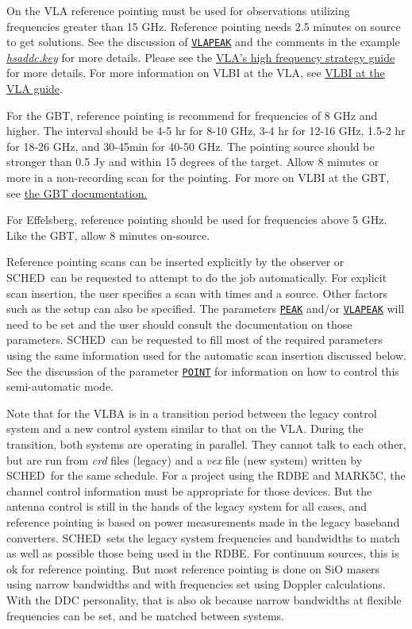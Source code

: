 \documentclass{report}
\newcommand{\schedb}{{\sc SCHED~}}
\begin{document}
On the VLA reference pointing must be used for observations utilizing
frequencies greater than 15 GHz.  Reference pointing needs 2.5 minutes
on source to get solutions.
See the discussion of 
{\hyperref[MP:VLAPEAK]{{\tt VLAPEAK}}} and the comments in the example
{\href{examples/hsaddc.key}{{\sl hsaddc.key}}} for more
details.  Please see  the 
{\href{https://science.nrao.edu/facilities/vla/docs/manuals/obsguide/modes/hifreq/strategy}{VLA's high frequency strategy guide}}
for more details.  For more information
on VLBI at the VLA, see 
{\href{https://science.nrao.edu/facilities/vla/docs/manuals/obsguide/modes/vlbi}{VLBI at the VLA guide}}.

For the GBT, reference pointing is recommend for frequencies of 8 GHz
and higher.  The interval should be 4-5 hr for 8-10 GHz, 3-4 hr for
12-16 GHz, 1.5-2 hr for 18-26 GHz, and 30-45min for 40-50 GHz.  The
pointing source should be stronger than 0.5 Jy and within 15 degrees
of the target.  Allow 8 minutes or more in a non-recording scan for
the pointing.  For more on VLBI at the GBT, see 
{\href{http://www.gb.nrao.edu/~fghigo/gbtdoc/vlbinfo.html}{the GBT documentation.}}

For Effelsberg, reference pointing should be used for frequencies 
above 5 GHz.  Like the GBT, allow 8 minutes on-source.

Reference pointing scans can be inserted explicitly by the observer or
\schedb can be requested to attempt to do the job automatically.  For
explicit scan insertion, the user specifies a scan with times and a
source.  Other factors such as the setup can also be specified.  The
parameters 
{\hyperref[MP:PEAK]{{\tt PEAK}}} and/or 
{\hyperref[MP:VLAPEAK]{{\tt VLAPEAK}}}
will need to be set and the user should consult
the documentation on those parameters.  \schedb can be requested to
fill most of the required parameters using the same information used
for the automatic scan insertion discussed below.  See the discussion
of the parameter 
{\hyperref[MP:POINT]{{\tt POINT}}} for information on
how to control this semi-automatic mode.

Note that for the VLBA is in a transition period between the legacy
control system and a new control system similar to that on the VLA.
During the transition, both systems are operating in parallel.  They
cannot talk to each other, but are run from {\sl crd} files (legacy)
and a {\sl vex} file (new system) written by \schedb for the same
schedule.  For a project using the RDBE and MARK5C, the channel
control information must be appropriate for those devices.  But the
antenna control is still in the hands of the legacy system for all
cases, and reference pointing is based on power measurements made in
the legacy baseband converters.  \schedb sets the legacy system
frequencies and bandwidths to match as well as possible those being
used in the RDBE.  For continuum sources, this is ok for reference
pointing.  But most reference pointing is done on SiO masers using
narrow bandwidths and with frequencies set using Doppler calculations.
With the DDC personality, that is also ok because narrow bandwidths
at flexible frequencies can be set, and be matched between systems.
\end{document}
